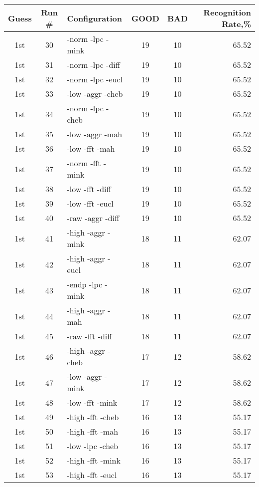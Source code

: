 \begin{table}
\begin{minipage}[b]{\textwidth}
\centering
\begin{tabular}{|c|c|l|c|c|r|} \hline
Guess & Run \# & Configuration & GOOD & BAD & Recognition Rate,\%\\ \hline\hline
1st & 30 & -norm -lpc -mink  & 19 & 10 & 65.52\\ \hline
1st & 31 & -norm -lpc -diff  & 19 & 10 & 65.52\\ \hline
1st & 32 & -norm -lpc -eucl  & 19 & 10 & 65.52\\ \hline
1st & 33 & -low -aggr -cheb  & 19 & 10 & 65.52\\ \hline
1st & 34 & -norm -lpc -cheb  & 19 & 10 & 65.52\\ \hline
1st & 35 & -low -aggr -mah  & 19 & 10 & 65.52\\ \hline
1st & 36 & -low -fft -mah  & 19 & 10 & 65.52\\ \hline
1st & 37 & -norm -fft -mink  & 19 & 10 & 65.52\\ \hline
1st & 38 & -low -fft -diff  & 19 & 10 & 65.52\\ \hline
1st & 39 & -low -fft -eucl  & 19 & 10 & 65.52\\ \hline
1st & 40 & -raw -aggr -diff  & 19 & 10 & 65.52\\ \hline
1st & 41 & -high -aggr -mink  & 18 & 11 & 62.07\\ \hline
1st & 42 & -high -aggr -eucl  & 18 & 11 & 62.07\\ \hline
1st & 43 & -endp -lpc -mink  & 18 & 11 & 62.07\\ \hline
1st & 44 & -high -aggr -mah  & 18 & 11 & 62.07\\ \hline
1st & 45 & -raw -fft -diff  & 18 & 11 & 62.07\\ \hline
1st & 46 & -high -aggr -cheb  & 17 & 12 & 58.62\\ \hline
1st & 47 & -low -aggr -mink  & 17 & 12 & 58.62\\ \hline
1st & 48 & -low -fft -mink  & 17 & 12 & 58.62\\ \hline
1st & 49 & -high -fft -cheb  & 16 & 13 & 55.17\\ \hline
1st & 50 & -high -fft -mah  & 16 & 13 & 55.17\\ \hline
1st & 51 & -low -lpc -cheb  & 16 & 13 & 55.17\\ \hline
1st & 52 & -high -fft -mink  & 16 & 13 & 55.17\\ \hline
1st & 53 & -high -fft -eucl  & 16 & 13 & 55.17\\ \hline

\end{tabular}
\end{minipage}
\end{table}
